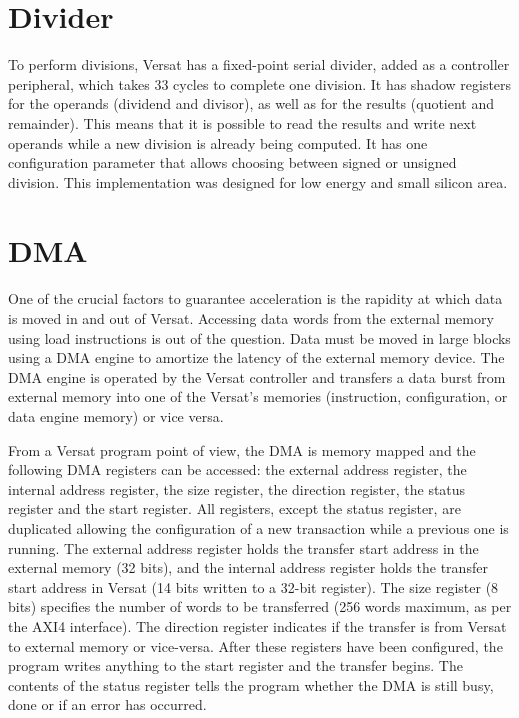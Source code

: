 \section{Divider}
\label{section:divider}

To perform divisions, Versat has a fixed-point serial divider, added
as a controller peripheral, which takes 33 cycles to complete one
division. It has shadow registers for the operands (dividend and
divisor), as well as for the results (quotient and remainder). This
means that it is possible to read the results and write next operands
while a new division is already being computed. It has one
configuration parameter that allows choosing between signed or
unsigned division. This implementation was designed for low energy and
small silicon area.

\section{DMA}
\label{section:dma}

One of the crucial factors to guarantee acceleration is the rapidity
at which data is moved in and out of Versat. Accessing data words from
the external memory using load instructions is out of the
question. Data must be moved in large blocks using a DMA engine to
amortize the latency of the external memory device. The DMA engine is
operated by the Versat controller and transfers a data burst from
external memory into one of the Versat's memories (instruction,
configuration, or data engine memory) or vice versa.

From a Versat program point of view, the DMA is memory mapped and the
following DMA registers can be accessed: the external address
register, the internal address register, the size register, the
direction register, the status register and the start register. All
registers, except the status register, are duplicated allowing the
configuration of a new transaction while a previous one is
running. The external address register holds the transfer start
address in the external memory (32 bits), and the internal address
register holds the transfer start address in Versat (14 bits written
to a 32-bit register). The size register (8 bits) specifies the number
of words to be transferred (256 words maximum, as per the AXI4
interface). The direction register indicates if the transfer is from
Versat to external memory or vice-versa. After these registers have
been configured, the program writes anything to the start register and
the transfer begins. The contents of the status register tells the
program whether the DMA is still busy, done or if an error has
occurred.


